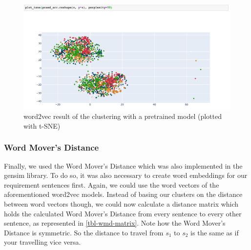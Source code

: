 \begin{figure}[ht]
  \begin{center}
    \includegraphics[width=\textwidth]{screenshots/google_word_2_vec_tsne_opti4.png}
    \caption{word2vec result of the clustering with a pretrained model (plotted with t-SNE)}
    \label{fig:w2v-pretrained-4}
  \end{center}
\end{figure}
\FloatBarrier

\subsubsection{Word Mover's Distance} %
\label{sub:own_wmd}
Finally, we used the Word Mover's Distance which was also implemented in the gensim library. To do so, it was also necessary to create word embeddings for our requirement sentences first. Again, we could use the word vectors of the aforementioned word2vec models. Instead of basing our clusters on the distance between word vectors though, we could now calculate a distance matrix which holds the calculated Word Mover's Distance from every sentence to every other sentence, as represented in \autoref{tbl-wmd-matrix}. Note how the Word Mover's Distance is symmetric. So the distance to travel from $s_1$ to $s_2$ is the same as if your travelling vice versa.

